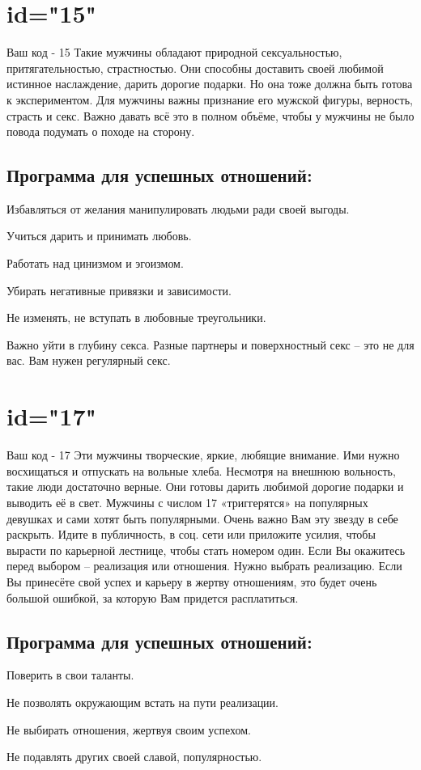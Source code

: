 \section{id="15"}{Ваш код - 15}
Такие мужчины обладают природной сексуальностью, притягательностью, 
страстностью. Они способны доставить своей любимой истинное 
наслаждение, дарить дорогие подарки. Но она тоже должна быть готова 
к экспериментом. Для мужчины важны признание его мужской фигуры, 
верность, страсть и секс. Важно давать всё это в полном объёме, 
чтобы у мужчины не было повода подумать о походе на сторону.
\subsection{Программа для успешных отношений:}
\item Избавляться от желания манипулировать людьми ради своей выгоды.
\item Учиться дарить и принимать любовь.
\item Работать над цинизмом и эгоизмом.
\item Убирать негативные привязки и зависимости.
\item Не изменять, не вступать в любовные треугольники.
\item Важно уйти в глубину секса. Разные партнеры и поверхностный 
секс – это не для вас. Вам нужен регулярный секс.
\endsubsection
\endsection

\section{id="17"}{Ваш код - 17}
Эти мужчины творческие, яркие, любящие внимание. Ими нужно 
восхищаться и отпускать на вольные хлеба. Несмотря на внешнюю 
вольность, такие люди достаточно верные. Они готовы дарить любимой 
дорогие подарки и выводить её в свет. Мужчины с числом 17 
«триггерятся» на популярных девушках и сами хотят быть популярными. 
Очень важно Вам эту звезду в себе раскрыть. Идите в публичность, 
в соц. сети или приложите усилия, чтобы вырасти по карьерной 
лестнице, чтобы стать номером один. Если Вы окажитесь перед выбором 
– реализация или отношения. Нужно выбрать реализацию. Если Вы 
принесёте свой успех и карьеру в жертву отношениям, это будет 
очень большой ошибкой, за которую Вам придется расплатиться.
\subsection{Программа для успешных отношений:}
\item Поверить в свои таланты.
\item Не позволять окружающим встать на пути реализации.
\item Не выбирать отношения, жертвуя своим успехом.
\item Не подавлять других своей славой, популярностью.
\endsubsection
\endsection


